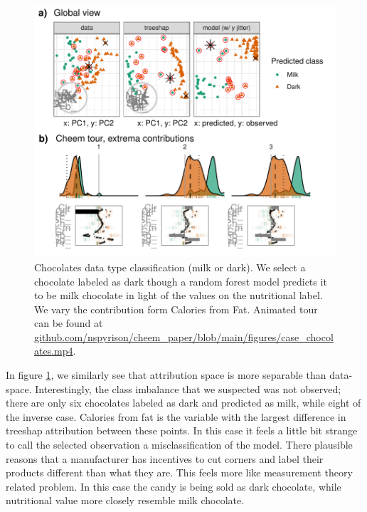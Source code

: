 \documentclass[
  article]{article}
\begin{document}
\begin{figure}

{\centering \includegraphics[width=1\linewidth]{./figures/case_chocolates} 

}

\caption{Chocolates data type classification (milk or dark). We select a chocolate labeled as dark though a random forest model predicts it to be milk chocolate in light of the values on the nutritional label. We vary the contribution form Calories from Fat. Animated tour can be found at \href{https://github.com/nspyrison/cheem_paper/blob/main/figures/case_chocolates.mp4}{github.com/nspyrison/cheem\_paper/blob/main/figures/case\_chocolates.mp4}.}\label{fig:casechocolates}
\end{figure}

In figure \ref{fig:casechocolates}, we similarly see that attribution space is more separable than data-space. Interestingly, the class imbalance that we suspected was not observed; there are only six chocolates labeled as dark and predicted as milk, while eight of the inverse case. Calories from fat is the variable with the largest difference in treeshap attribution between these points. In this case it feels a little bit strange to call the selected observation a misclassification of the model. There plausible reasons that a manufacturer has incentives to cut corners and label their products different than what they are. This feels more like measurement theory related problem. In this case the candy is being sold as dark chocolate, while nutritional value more closely resemble milk chocolate.
\end{document}
